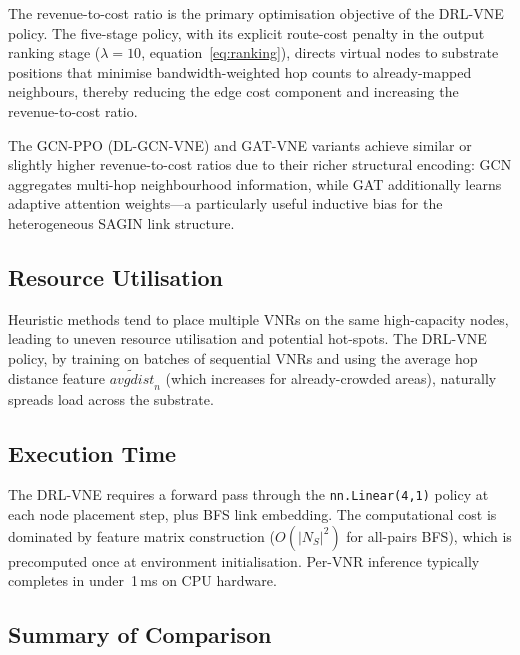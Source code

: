\documentclass[12pt,a4paper]{report}
\begin{document}
The revenue-to-cost ratio is the primary optimisation objective of the DRL-VNE policy.
The five-stage policy, with its explicit route-cost penalty in the output ranking stage
($\lambda=10$, equation~\eqref{eq:ranking}), directs virtual nodes to substrate positions that
minimise bandwidth-weighted hop counts to already-mapped neighbours, thereby reducing the edge
cost component and increasing the revenue-to-cost ratio.

The GCN-PPO (DL-GCN-VNE) and GAT-VNE variants achieve similar or slightly higher
revenue-to-cost ratios due to their richer structural encoding: GCN aggregates multi-hop
neighbourhood information, while GAT additionally learns adaptive attention weights---a
particularly useful inductive bias for the heterogeneous SAGIN link structure.

\subsection{Resource Utilisation}

Heuristic methods tend to place multiple VNRs on the same high-capacity nodes, leading to
uneven resource utilisation and potential hot-spots. The DRL-VNE policy, by training on batches
of sequential VNRs and using the average hop distance feature $\widetilde{avgdist}_n$ (which
increases for already-crowded areas), naturally spreads load across the substrate.

\subsection{Execution Time}

The DRL-VNE requires a forward pass through the \texttt{nn.Linear(4,1)} policy at each node
placement step, plus BFS link embedding. The computational cost is dominated by feature matrix
construction ($O(|N_S|^2)$ for all-pairs BFS), which is precomputed once at environment
initialisation. Per-VNR inference typically completes in under~1\,ms on CPU hardware.

\subsection{Summary of Comparison}
\end{document}
